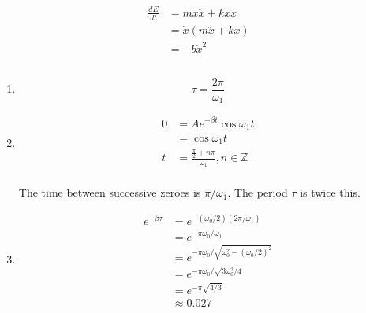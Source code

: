 \documentclass{article}
\begin{document}
\setcounter{subsection}{22}
\subsection{}

\begin{align*}
  \frac{d E}{d t} & = m \dot{x} \ddot{x} + k x \dot{x} \\
                  & = \dot{x} (m \ddot{x} + k x)       \\
                  & = -b \dot{x}^2
\end{align*}

\setcounter{subsection}{24}
\subsection{}

\begin{enumerate}
  \item \[\tau = \frac{2 \pi}{\omega_1}\]

  \item

        \begin{align*}
          0 & = A e^{-\beta t} \cos \omega_1 t                           \\
            & = \cos \omega_1 t                                          \\
          t & = \frac{\frac{\pi}{2} + n \pi}{\omega_1}, n \in \mathbb{Z} \\
        \end{align*}

        The time between successive zeroes is $\pi / \omega_1$. The period $\tau$ is twice this.

  \item

        \begin{align*}
          e^{-\beta \tau} & = e^{-(\omega_0 / 2) (2 \pi / \omega_1)}                   \\
                          & = e^{-\pi \omega_0 / \omega_1}                             \\
                          & = e^{-\pi \omega_0 / \sqrt{\omega_0^2 - (\omega_0 / 2)^2}} \\
                          & = e^{-\pi \omega_0 / \sqrt{3 \omega_0^2 / 4}}              \\
                          & = e^{-\pi \sqrt{4 / 3}}                                    \\
                          & \approx 0.027
        \end{align*}
\end{enumerate}
\end{document}
